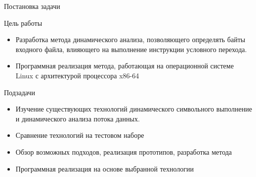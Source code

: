 \documentclass[10pt]{beamer}
\begin{document}
\begin{frame}{Постановка задачи}

  \begin{block}{Цель работы}
    \begin{itemize}
    \item Разработка метода динамического анализа, позволяющего определять байты входного файла, влияющего на выполнение инструкции условного перехода.
    \item Программная реализация метода, работающая на операционной системе Linux с архитектурой процессора x86-64
    \end{itemize}
  \end{block}
  \pause

  \begin{block}{Подзадачи}
    \begin{itemize}
      \item Изучение существующих технологий динамического символьного выполнение и динамического анализа потока данных.
      \item Сравнение технологий на тестовом наборе
      \item Обзор возможных подходов, реализация прототипов, разработка метода
      \item Программная реализация на основе выбранной технологии
    \end{itemize}
  \end{block}

\end{frame}
\end{document}
